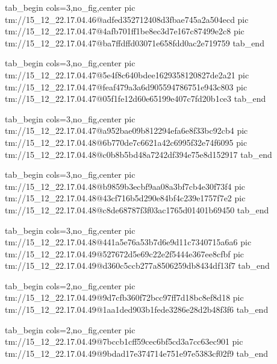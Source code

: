  
 
 
 
 

\qqSecCmtScr


\ifcmt
  tab_begin cols=3,no_fig,center
    pic tm://15_12_22.17.04.46@adfed352712408d3fbae745a2a504ecd
    pic tm://15_12_22.17.04.47@4afb701ff1be8ec3d7e167c87499e2c8
    pic tm://15_12_22.17.04.47@ba7ffdffd03071e658fdd0ac2e719759
  tab_end
\fi


\ifcmt
  tab_begin cols=3,no_fig,center
    pic tm://15_12_22.17.04.47@5e4f8c640bdee1629358120827de2a21
    pic tm://15_12_22.17.04.47@feaf479a3a6d905594786751e943c803
    pic tm://15_12_22.17.04.47@05f1fe12d60e65199e407c7fd20b1ce3
  tab_end
\fi


\ifcmt
  tab_begin cols=3,no_fig,center
    pic tm://15_12_22.17.04.47@a952bae09b812294efa6e8f33bc92cb4
    pic tm://15_12_22.17.04.48@6b770de7c6621a42c6995f32e74f6095
    pic tm://15_12_22.17.04.48@c0b8b5bd48a7242df394e75e8d152917
  tab_end
\fi


\ifcmt
  tab_begin cols=3,no_fig,center
    pic tm://15_12_22.17.04.48@b9859b3ecbf9aa08a3bf7cb4e30f73f4
    pic tm://15_12_22.17.04.48@43cf716b5d290e84bf4c239e1757f7e2
    pic tm://15_12_22.17.04.48@c8de68787f3f03ac1765d01401b69450
  tab_end
\fi


\ifcmt
  tab_begin cols=3,no_fig,center
    pic tm://15_12_22.17.04.48@441a5e76a53b7d6e9d11c7340715a6a6
    pic tm://15_12_22.17.04.49@527672d5e69c22e2f5444e367ee8cfbf
    pic tm://15_12_22.17.04.49@d360c5ccb277a8506259db8434df13f7
  tab_end
\fi


\ifcmt
  tab_begin cols=2,no_fig,center
    pic tm://15_12_22.17.04.49@9d7cfb360f72bcc97ff7d18bc8ef8d18
    pic tm://15_12_22.17.04.49@1aa1ded903b1fede3286e28d2b48f3f6
  tab_end
\fi


\ifcmt
  tab_begin cols=2,no_fig,center
    pic tm://15_12_22.17.04.49@7bccb1cff59cec6bf5cd3a7cc63ec901
    pic tm://15_12_22.17.04.49@9bdad17e374714e751e97e5383cf02f9
  tab_end
\fi

